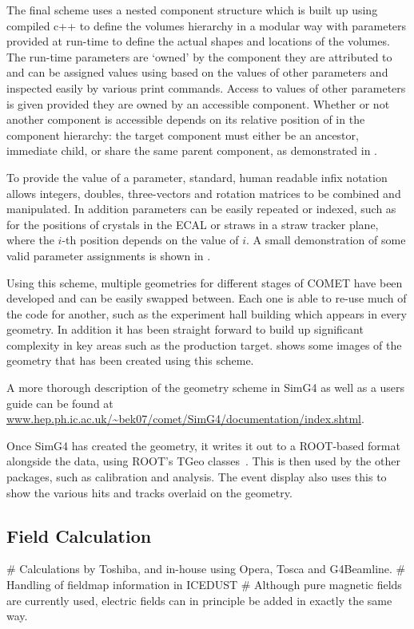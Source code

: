 \FigGeometryHeirarchy

The final scheme uses a nested component structure which is built up using compiled c++ to define the volumes hierarchy in a modular way with parameters provided at run-time to define the actual shapes and locations of the volumes.
The run-time parameters are `owned' by the component they are attributed to and can be assigned values using based on the values of other parameters and inspected easily by various print commands.
Access to values of other parameters is given provided they are owned by an accessible component.
Whether or not another component is accessible depends on its relative position of in the component hierarchy: the target component must either be an ancestor, immediate child, or share the same parent component, as demonstrated in .

To provide the value of a parameter, standard, human readable infix notation allows integers, doubles, three-vectors and rotation matrices to be combined and manipulated.
In addition parameters can be easily repeated or indexed, such as for the positions of crystals in the ECAL or straws in a straw tracker plane, where the $i$-th position depends on the value of $i$.
A small demonstration of some valid parameter assignments is shown in .

Using this scheme, multiple geometries for different stages of COMET have been developed and can be easily swapped between.
Each one is able to re-use much of the code for another, such as the experiment hall building which appears in every geometry.
In addition it has been straight forward to build up significant complexity in key areas such as the production target.
 shows some images of the geometry that has been created using this scheme.

A more thorough description of the geometry scheme  in SimG4 as well as a users guide can be found at \url{www.hep.ph.ic.ac.uk/~bek07/comet/SimG4/documentation/index.shtml}.

Once SimG4 has created the geometry, it writes it out to a ROOT-based format alongside the data, using ROOT's TGeo classes~\cite{ROOTTGeo}.
This is then used by the other packages, such as calibration and analysis.  
The event display also uses this to show the various hits and tracks overlaid on the geometry.

\subsection{Field Calculation}
\begin{easylist}
# Calculations by Toshiba, and in-house using Opera, Tosca and G4Beamline.
# Handling of fieldmap information in ICEDUST
# Although pure magnetic fields are currently used, electric fields can in principle be added in exactly the same way.
\end{easylist}

